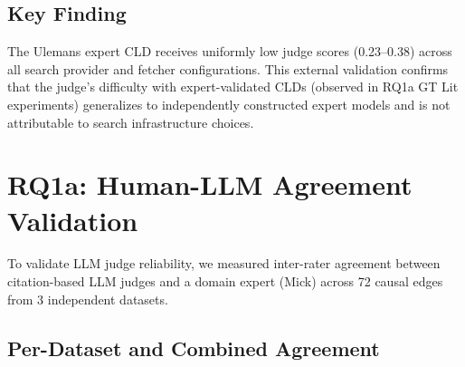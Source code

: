 \subsection{Key Finding}

The Ulemans expert CLD receives uniformly low judge scores (0.23--0.38) across all search provider and fetcher configurations. This external validation confirms that the judge's difficulty with expert-validated CLDs (observed in RQ1a GT Lit experiments) generalizes to independently constructed expert models and is not attributable to search infrastructure choices.

\section{RQ1a: Human-LLM Agreement Validation}

To validate LLM judge reliability, we measured inter-rater agreement between citation-based LLM judges and a domain expert (Mick) across 72 causal edges from 3 independent datasets.

\subsection{Per-Dataset and Combined Agreement}

